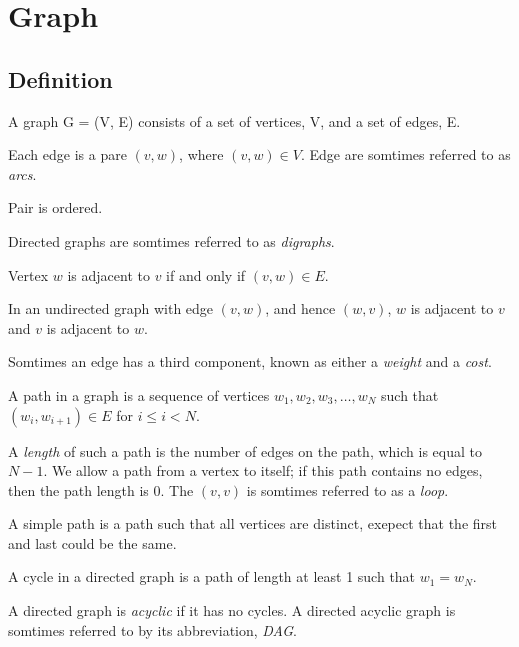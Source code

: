 \section{Graph}
\subsection{Definition}
\begin{definition}[graph]
	A graph G = (V, E) consists of a set of vertices, V, and a set of edges, E.
\end{definition}

Each edge is a pare $(v, w)$, where $(v, w) \in V$. Edge are somtimes referred
to as \emph{arcs}. 

\begin{definition}[directed]
	Pair is ordered.
\end{definition}

Directed graphs are somtimes referred to as \emph{digraphs}.

Vertex $w$ is adjacent to $v$ if and only if $(v, w) \in E$.

In an undirected graph with edge $(v, w)$, and hence $(w, v)$, $w$ is adjacent
to $v$ and $v$ is adjacent to $w$.

Somtimes an edge has a third component, known as either a \emph{weight} and 
a \emph{cost}.

\begin{definition}[path]
	A path in a graph is a sequence of vertices $w_1, w_2, w_3, \dots , w_N$
	such that $(w_i, w_{i+1}) \in E$ for $i \leq i < N$.
\end{definition}

A \emph{length} of such a path is the number of edges on the path, which is 
equal to $N - 1$. We allow a path from a vertex to itself; if this path contains
no edges, then the path length is 0. The $(v, v)$ is somtimes referred to as a
\emph{loop}.

\begin{definition}
	A simple path is a path such that all vertices are distinct, exepect that 
	the first and last could be the same.
\end{definition}

\begin{definition}[cycle]
	A cycle in a directed graph is a path of length at least 1 such that 
	$w_1 = w_N$.
\end{definition}

A directed graph is \emph{acyclic} if it has no cycles. A directed acyclic
graph is somtimes referred to by its abbreviation, \emph{DAG}.
